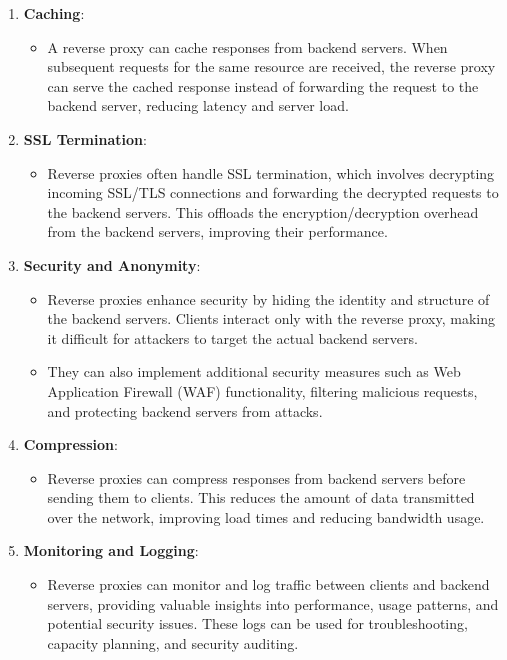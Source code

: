 \begin{enumerate}
    \item \textbf{Caching}:
    \begin{itemize}
        \item A reverse proxy can cache responses from backend servers. When subsequent requests for the same resource are received, the reverse proxy can serve the cached response instead of forwarding the request to the backend server, reducing latency and server load.
    \end{itemize}

    \item \textbf{SSL Termination}:
    \begin{itemize}
        \item Reverse proxies often handle SSL termination, which involves decrypting incoming SSL/TLS connections and forwarding the decrypted requests to the backend servers. This offloads the encryption/decryption overhead from the backend servers, improving their performance.
    \end{itemize}

    \item \textbf{Security and Anonymity}:
    \begin{itemize}
        \item Reverse proxies enhance security by hiding the identity and structure of the backend servers. Clients interact only with the reverse proxy, making it difficult for attackers to target the actual backend servers.
        \item They can also implement additional security measures such as Web Application Firewall (WAF) functionality, filtering malicious requests, and protecting backend servers from attacks.
    \end{itemize}

    \item \textbf{Compression}:
    \begin{itemize}
        \item Reverse proxies can compress responses from backend servers before sending them to clients. This reduces the amount of data transmitted over the network, improving load times and reducing bandwidth usage.
    \end{itemize}

    \item \textbf{Monitoring and Logging}:
    \begin{itemize}
        \item Reverse proxies can monitor and log traffic between clients and backend servers, providing valuable insights into performance, usage patterns, and potential security issues. These logs can be used for troubleshooting, capacity planning, and security auditing.
    \end{itemize}
\end{enumerate}

